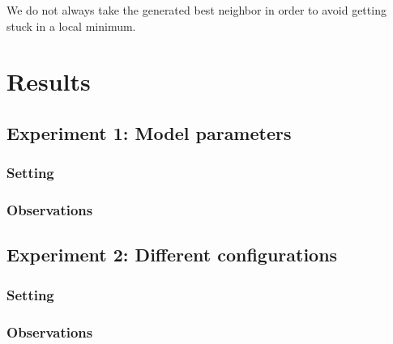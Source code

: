 \documentclass[11pt]{article}
\begin{document}
We do not always take the generated best neighbor in order to avoid getting stuck in a local minimum. 

\section{Results}

\subsection{Experiment 1: Model parameters}

\subsubsection{Setting}

\subsubsection{Observations}

\subsection{Experiment 2: Different configurations}

\subsubsection{Setting}

\subsubsection{Observations}
\end{document}
